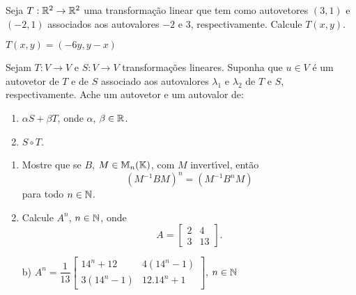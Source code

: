 \documentclass[12pt]{exam}
\begin{document}
\begin{exercicio}
  Seja $T : \mathbb{R}^2 \to \mathbb{R}^2$ uma transforma\c{c}\~ao linear que tem como autovetores $(3,1)$ e $(-2,1)$ associados aos autovalores $-2$ e $3$, respectivamente. Calcule $T(x,y)$.
  \begin{solucao}
    $T(x,y) = (-6y, y -x)$
  \end{solucao}
\end{exercicio}

\begin{exercicio}
  Sejam $T : V \to V$ e $S : V \to V$ transforma\c{c}\~oes lineares. Suponha que $u \in V$ \'e um autovetor de $T$ e de $S$ associado aos autovalores $\lambda_1$ e $\lambda_2$ de $T$ e $S$, respectivamente. Ache um autovetor e um autovalor de:
  \begin{enumerate}[label=({\alph*})]
    \item $\alpha S + \beta T$, onde $\alpha$, $\beta \in \mathbb{R}$.
    \item $S \circ T$.
  \end{enumerate}
\end{exercicio}

\begin{exercicio}
  \begin{enumerate}[label=({\alph*})]
    \item Mostre que se $B$, $M \in \mathbb{M}_n(\mathbb{K})$, com $M$ invert{\'\i}vel, ent\~ao
    \[
        (M^{-1}BM)^n = (M^{-1}B^nM)
    \]
    para todo $n \in \mathbb{N}$.
    \item Calcule $A^n$, $n \in \mathbb{N}$, onde
    \[
      A = \begin{bmatrix}
        2 & 4\\
        3 & 13
      \end{bmatrix}.
    \]
  \end{enumerate}
  \begin{solucao}
    \begin{enumerate}
    \item[b)] $A^n = \dfrac{1}{13}\begin{bmatrix}
      14^n + 12 & 4(14^n - 1)\\3(14^n - 1) & 12.14^n + 1
    \end{bmatrix}$, $n \in \mathbb{N}$
  \end{enumerate}
  \end{solucao}
\end{exercicio}
\end{document}

